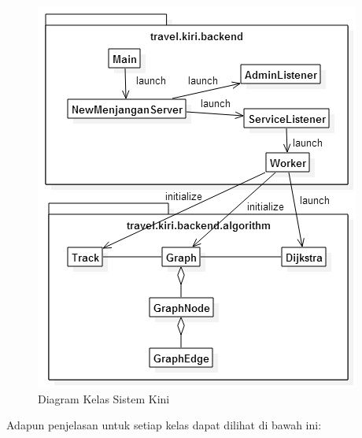 \begin{figure}
	\centering
	\includegraphics[scale=0.5]{Gambar/2_diagram_kelas_sistem_kini}
	\caption{Diagram Kelas Sistem Kini} 
	\label{fig:2_diagram_kelas_sistem_kini}
\end{figure}

Adapun penjelasan untuk setiap kelas dapat dilihat di bawah ini:


